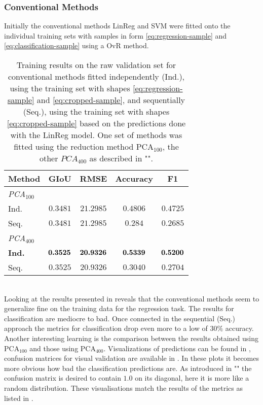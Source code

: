\subsubsection{Conventional Methods}
Initially the conventional methods LinReg and SVM were fitted onto the individual training sets with samples in form \eqref{eq:regression-sample} and \eqref{eq:classification-sample} using a OvR method.
\begin{table}[!ht]
    \centering
    \begin{tabular}{|l|c|c|c|c|}
        \hline
        \textbf{Method} & \textbf{GIoU} & \textbf{RMSE}  & \textbf{Accuracy} & \textbf{F1} \\
        \hline
        \hline
        \multicolumn{5}{|l|}{\textit{PCA${}_{100}$} }
        \\
        \hline
        Ind. & $0.3481$ & $21.2985$ &$0.4806$ & $0.4725$\\
        Seq. & $0.3481$ & $21.2985$ & $0.284$ & $0.2685$ \\
        \hline
        \hline
        \multicolumn{5}{|l|}{\textit{PCA${}_{400}$} }
        \\
        \hline
        \textbf{Ind.} & $\bm{0.3525}$ & $\bm{20.9326}$ &$\bm{0.5339}$ & $\bm{0.5200}$\\
        Seq. & $0.3525$ & $20.9326$ & $0.3040$ & $0.2704$ \\
        \hline
    \end{tabular}
    \caption{Training results on the raw validation set for conventional methods fitted independently (Ind.), using the training set with shapes \eqref{eq:regression-sample} and \eqref{eq:cropped-sample}, and sequentially (Seq.), using the training set with shapes \eqref{eq:cropped-sample} based on the predictions done with the LinReg model. One set of methods was fitted using the reduction method $\text{PCA}_{100}$, the other $PCA_{400}$ as described in ""\footnotemark.
    }
    \label{fig:conventional-results}
\end{table}
\\
Looking at the results presented in  reveals that the conventional methods seem to generalize fine on the training data for the regression task.
The results for classification are mediocre to bad.
Once connected in the sequential (Seq.) approach the metrics for classification drop even more to a low of $30\%$ accuracy.
Another interesting learning is the comparison between the results obtained using $\text{PCA}_{100}$ and those using $\text{PCA}_{400}$.
Visualizations of predictions can be found in , confusion matrices for visual validation are available in .
In these plots it becomes more obvious how bad the classification predictions are.
As introduced in "" the confusion matrix is desired to contain $1.0$ on its diagonal, here it is more like a random distribution.
These visualisations match the results of the metrics as listed in .

